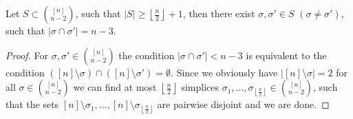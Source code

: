 \begin{lem}\label{lemma13}
Let \(S\subset\binom{[n]}{n-2}\), such that \(\left|S\right|\geq\left\lfloor\frac{n}{2}\right\rfloor+1\), then there exist \(\sigma,\sigma'\in S\) \((\sigma\neq\sigma')\), such that \(\left|\sigma\cap\sigma'\right|=n-3\).
\begin{proof}
For \(\sigma,\sigma'\in\binom{[n]}{n-2}\) the condition \(\left|\sigma\cap\sigma'\right|<n-3\) is equivalent to the condition \(([n]\setminus\sigma)\cap([n]\setminus\sigma')=\emptyset\). Since we obviously have \(\left|[n]\setminus\sigma\right|=2\) for all \(\sigma\in\binom{[n]}{n-2}\) we can find at most \(\left\lfloor\frac{n}{2}\right\rfloor\) simplices \(\sigma_1,\ldots,\sigma_{\left\lfloor\frac{n}{2}\right\rfloor}\in\binom{[n]}{n-2}\), such that the sets \([n]\setminus\sigma_1,\ldots,[n]\setminus\sigma_{\left\lfloor\frac{n}{2}\right\rfloor}\) are pairwise disjoint and we are done.
\end{proof}
\end{lem}

